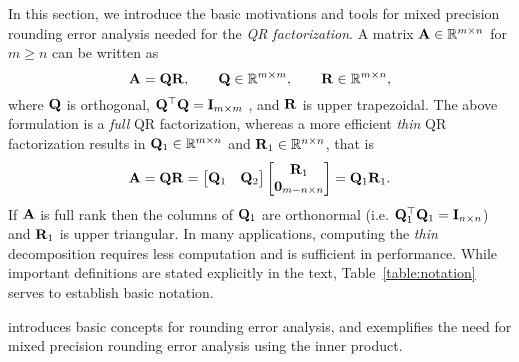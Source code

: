 In this section, we introduce the basic motivations and tools for mixed precision rounding error analysis needed for the {\it QR factorization}.
A matrix $\mathbf{A} \in \mathbb{R}^{m \times n}$ for $m\geq n$ can be written as
\[\mathbf{A} = \mathbf{QR},\qquad\mathbf{Q} \in \mathbb{R}^{m \times m},\qquad\mathbf{R} \in \mathbb{R}^{m \times n},\]
where $\mathbf{Q}$ is orthogonal, $\mathbf{Q}^\top \mathbf{Q} = \mathbf{I}_{m\times m}$ , and $\mathbf{R}$ is upper trapezoidal.
The above formulation is a \emph{full} QR factorization, whereas a more efficient \emph{thin} QR factorization results in $\mathbf{Q}_{1}\in\mathbb{R}^{m\times n}$ and $\mathbf{R}_{1}\in\mathbb{R}^{n\times n}$, that is
\[
\mathbf{A} = \mathbf{QR} = \begin{bmatrix}\mathbf{Q}_{1} & \mathbf{Q}_2\end{bmatrix} \begin{bmatrix}\mathbf{R}_{1} \\ \mathbf{0}_{m-n \times n}\end{bmatrix} = \mathbf{Q}_{1}\mathbf{R}_{1}.
\]
If $\mathbf{A}$ is full rank then the columns of $\mathbf{Q}_{1}$ are orthonormal (i.e. $\mathbf{Q}_{1}^{\top}\mathbf{Q}_{1}=\mathbf{I}_{n\times n}$) and $\mathbf{R}_1$ is upper triangular.
In many applications, computing the \emph{thin} decomposition requires less computation and is sufficient in performance. 
While important definitions are stated explicitly in the text, Table~\ref{table:notation} serves to establish basic notation.

 introduces basic concepts for rounding error analysis, and  exemplifies the need for mixed precision rounding error analysis using the inner product.
